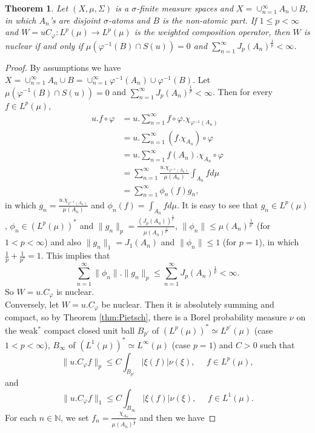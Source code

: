 \documentclass[10pt,a4paper]{amsart}
\newtheorem{thm}{Theorem}
\begin{document}
\begin{thm}\label{n.pp}
Let $(X, \mu, \Sigma)$ is a $\sigma$-finite measure spaces and $X=\cup^{\infty}_{n=1}A_n\cup B$, in which $A_n$'s are disjoint $\sigma$-atoms and $B$ is the non-atomic part. If $1\leq p<\infty$  and $W=uC_{\varphi}:L^p(\mu)\rightarrow L^p(\mu)$ is the weighted composition operator, then $W$ is nuclear if and only if $\mu(\varphi^{-1}(B)\cap S(u))=0$ and $\sum^{\infty}_{n=1}J_p(A_n)^{\frac{1}{p}}<\infty$.
\end{thm}

\begin{proof}
By assumptions we have $X=\cup^{\infty}_{n=1}A_n\cup B=\cup^{\infty}_{n=1}\varphi^{-1}(A_n)\cup \varphi^{-1}(B)$. Let $\mu(\varphi^{-1}(B)\cap S(u))=0$ and $\sum^{\infty}_{n=1}J_p(A_n)^{\frac{1}{p}}<\infty$. Then for every $f\in L^p(\mu)$,
\begin{align*}
u.f\circ \varphi&=u.\sum^{\infty}_{n=1}f\circ\varphi.\chi_{\varphi^{-1}(A_n)}\\
&=u.\sum^{\infty}_{n=1}(f.\chi_{A_n})\circ\varphi\\
&=u.\sum^{\infty}_{n=1}f(A_n).\chi_{A_n}\circ\varphi\\
&=\sum^{\infty}_{n=1}\frac{u.\chi_{\varphi^{-1}(A_n)}}{\mu(A_n)}\int_{A_n}fd\mu\\
&=\sum^{\infty}_{n=1}\phi_n(f)g_n,
\end{align*}
in which $g_n=\frac{u.\chi_{\varphi^{-1}(A_n)}}{\mu(A_n)}$ and $\phi_n(f)=\int_{A_n}fd\mu$. It is easy to see that $g_n\in L^p(\mu)$, $\phi_n\in (L^p(\mu))^*$ and $\|g_n\|_p=\frac{(J_p(A_n))^{\frac{1}{p}}}{\mu(A_n)^{\frac{1}{p'}}}$, $\|\phi_n\|\leq\mu(A_n)^{\frac{1}{p'}}$ (for $1<p<\infty$) and also $\|g_n\|_1=J_1(A_n)$ and $\|\phi_n\|\leq1$ (for $p=1$), in which $\frac{1}{p}+\frac{1}{p'}=1$. This implies that 
$$\sum^{\infty}_{n=1}\|\phi_n\|.\|g_n\|_p\leq \sum^{\infty}_{n=1}J_p(A_n)^{\frac{1}{p}}<\infty.$$
So $W=u.C_{\varphi}$ is nuclear.\\
Conversely, let $W=u.C_{\varphi}$ be nuclear. Then it is absolutely summing and compact, so by Theorem \ref{thm:Pietsch}, there is a Borel probability measure $\nu$ on the weak$^*$ compact closed unit ball $B_{p'}$ of $(L^p(\mu))^*\simeq L^{p'}(\mu)$ (case $1<p<\infty$), $B_{\infty}$ of $(L^1(\mu))^*\simeq L^{\infty}(\mu)$ (case $p=1$) and $C>0$ such that
$$\|u.C_{\varphi}f\|_p\leq C \int_{B_{p'}}|\xi(f)|\nu(\xi), \ \ \ \ \ \ f\in L^p(\mu),$$
and 
$$\|u.C_{\varphi}f\|_1\leq C \int_{B_{\infty}}|\xi(f)|\nu(\xi), \ \ \ \ \ \ f\in L^1(\mu).$$
For each $n\in \mathbb{N}$, we set $f_n=\frac{\chi_{A_n}}{\mu(A_n)^{\frac{1}{p}}}$ and then we have

\end{proof}
\end{document}
